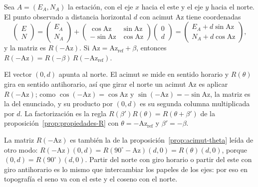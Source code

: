 \begin{proposicion}\label{prop:radiado-rotacion}
Sea \(A=(E_A,N_A)\) la estación, con el eje \(x\) hacia el este y el eje \(y\) hacia el norte.
El punto observado a distancia horizontal \(d\) con acimut \(\mathrm{Az}\) tiene coordenadas
\[
\begin{pmatrix}E\\N\end{pmatrix}
=\begin{pmatrix}E_A\\N_A\end{pmatrix}
+\begin{pmatrix}\cos\mathrm{Az}&\sin\mathrm{Az}\\-\sin\mathrm{Az}&\cos\mathrm{Az}\end{pmatrix}
\begin{pmatrix}0\\d\end{pmatrix}
=\begin{pmatrix}E_A+d\sin\mathrm{Az}\\N_A+d\cos\mathrm{Az}\end{pmatrix},
\]
y la matriz es \(R(-\mathrm{Az})\). Si \(\mathrm{Az}=\mathrm{Az}_{\text{ref}}+\beta\), entonces
\(R(-\mathrm{Az})=R(-\beta)\,R(-\mathrm{Az}_{\text{ref}})\).
\end{proposicion}

\begin{demostracion}
El vector \((0,d)\) apunta al norte. El acimut se mide en sentido horario y \(R(\theta)\) gira
en sentido antihorario, así que girar el norte un acimut \(\mathrm{Az}\) es aplicar
\(R(-\mathrm{Az})\); como \(\cos(-\mathrm{Az})=\cos\mathrm{Az}\) y
\(\sin(-\mathrm{Az})=-\sin\mathrm{Az}\), la matriz es la del enunciado, y su producto por
\((0,d)\) es su segunda columna multiplicada por \(d\). La factorización es la regla
\(R(\beta')R(\theta)=R(\theta+\beta')\) de la proposición~\ref{prop:propiedades-R} con
\(\theta=-\mathrm{Az}_{\text{ref}}\) y \(\beta'=-\beta\).
\end{demostracion}

La matriz \(R(-\mathrm{Az})\) es también la de la proposición~\ref{prop:acimut-theta} leída de
otro modo: \(R(-\mathrm{Az})(0,d)=R(90^\circ-\mathrm{Az})(d,0)=R(\theta)(d,0)\), porque
\((0,d)=R(90^\circ)(d,0)\). Partir del norte con giro horario o partir del este con giro
antihorario es lo mismo que intercambiar los papeles de los ejes: por eso en topografía el
seno va con el este y el coseno con el norte.

